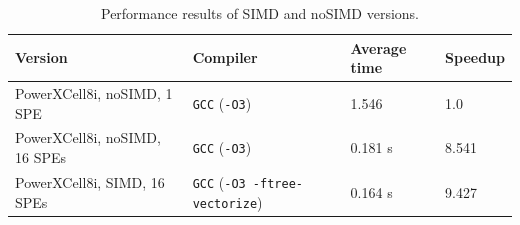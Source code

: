 \begin{table}[htb]
\begin{footnotesize}
\caption{Performance results of SIMD and noSIMD versions.}
\label{tab:t1}
\newcommand{\m}{\hphantom{$-$}}
\newcommand{\cc}[1]{\multicolumn{1}{c}{#1}}
\renewcommand{\tabcolsep}{0.5pc} %
\renewcommand{\arraystretch}{1.2} %
\begin{tabular}{@{}llll}
\hline
\textbf{Version} & \textbf{Compiler} & \textbf{Average time} & \textbf{Speedup} \\
\hline
PowerXCell8i, noSIMD, 1 SPE & \texttt{GCC} (\texttt{-O3}) & 1.546 & 1.0 \\
PowerXCell8i, noSIMD, 16 SPEs & \texttt{GCC} (\texttt{-O3}) & 0.181 s &  8.541 \\
PowerXCell8i, SIMD, 16 SPEs & \texttt{GCC} (\texttt{-O3 -ftree-vectorize}) & 0.164 s & 9.427 \\
\hline
\end{tabular}\\[2pt]
\end{footnotesize}
\end{table}

